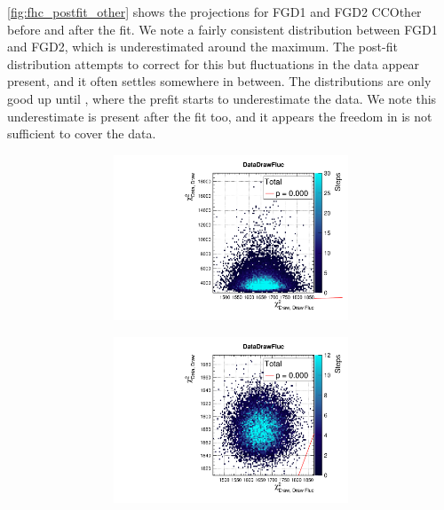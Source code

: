\autoref{fig:fhc_postfit_other} shows the projections for FGD1 and FGD2 CCOther before and after the fit. We note a fairly consistent \pmu distribution between FGD1 and FGD2, which is underestimated around the maximum. The post-fit distribution attempts to correct for this but fluctuations in the data appear present, and it often settles somewhere in between. The \cosmu distributions are only good up until , where the prefit starts to underestimate the data. We note this underestimate is present after the fit too, and it appears the freedom in \cosmu is not sufficient to cover the data. 
\begin{figure}[h]
\begin{subfigure}[t]{\textwidth}
\begin{subfigure}[t]{0.24\textwidth}
	\includegraphics[width=\textwidth, trim={0mm 0mm 0mm 8mm}, clip,page=28]{figures/mach3/data/priorpred/2017b_NewDet_3Xsec_4Det_5Flux_NewXSecTune_Data_merge_PriorPred_procs}
\end{subfigure}
\begin{subfigure}[t]{0.24\textwidth}
	\includegraphics[width=\textwidth, trim={0mm 0mm 0mm 8mm}, clip,page=28]{figures/mach3/data/postpred/2017b_NewData_NewDet_UpdXsecStep_2Xsec_4Det_5Flux_0_PostPred_procs}

\end{subfigure}
\end{subfigure}
\end{figure}
